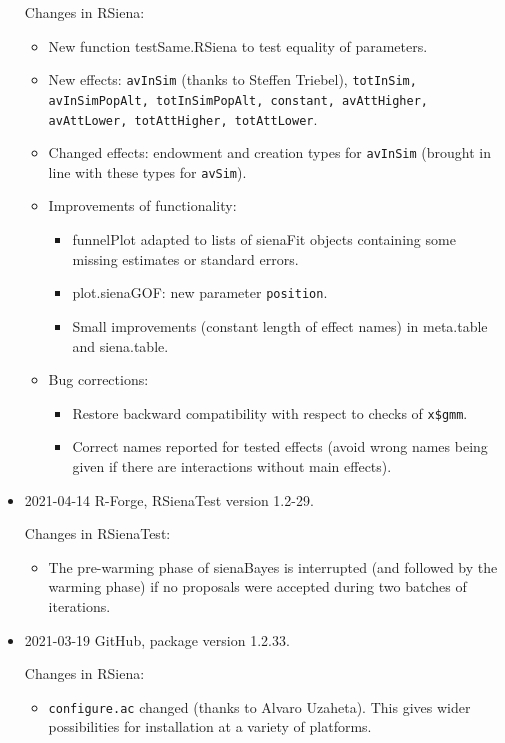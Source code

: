 \documentclass[a4paper,fleqn,11pt]{article}
\newcommand{\+}{\, + \,}
\newcommand{\sfn}[1]{\textsf{#1}}
\begin{document}
\begin{small}
\begin{itemize}
Changes in RSiena:
\begin{itemize}
\item New function \sfn{testSame.RSiena} to test equality of parameters.
\item New effects: \texttt{avInSim} (thanks to Steffen Triebel),
    \texttt{totInSim, avInSimPopAlt, totInSimPopAlt, constant,
     avAttHigher, avAttLower, totAttHigher, totAttLower}.
\item Changed effects: endowment and creation types for \texttt{avInSim}
     (brought in line with these types for \texttt{avSim}).
\item Improvements of functionality:
   \begin{itemize}
   \item \sfn{funnelPlot} adapted to lists of \sfn{sienaFit} objects
     containing some missing estimates or standard errors.
   \item \sfn{plot.sienaGOF}: new parameter \texttt{position}.
   \item Small improvements (constant length of effect names) in
     \sfn{meta.table} and \textsf{siena.table}.
    \end{itemize}
\item Bug corrections:
   \begin{itemize}
   \item Restore backward compatibility with respect to checks of \texttt{x\$gmm}.
   \item Correct names reported for tested effects (avoid wrong names being given
     if there are interactions without main effects).
    \end{itemize}
\end{itemize}


\item 2021-04-14  R-Forge, \sfn{RSienaTest} version 1.2-29.

Changes in \textsf{RSienaTest}:
\begin{itemize}
\item The pre-warming phase of \textsf{sienaBayes} is interrupted
    (and followed by the warming phase) if no proposals were accepted
    during two batches of iterations.
\end{itemize}

\item 2021-03-19  GitHub, package version 1.2.33.

Changes in RSiena:
\begin{itemize}
\item \texttt{configure.ac} changed (thanks to  Alvaro Uzaheta).
	This gives wider possibilities for installation at a variety of platforms.
\end{itemize}




\end{itemize}
\end{small}
\end{document}
